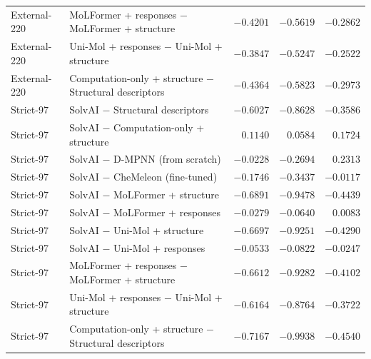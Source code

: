 \begin{longtable}{@{}p{}p{}rrr@{}}
External-220 & MoLFormer + responses $-$ MoLFormer + structure & $-0.4201$ & $-0.5619$ & $-0.2862$ \\
External-220 & Uni-Mol + responses $-$ Uni-Mol + structure & $-0.3847$ & $-0.5247$ & $-0.2522$ \\
External-220 & Computation-only + structure $-$ Structural descriptors & $-0.4364$ & $-0.5823$ & $-0.2973$ \\
Strict-97 & SolvAI $-$ Structural descriptors & $-0.6027$ & $-0.8628$ & $-0.3586$ \\
Strict-97 & SolvAI $-$ Computation-only + structure & $0.1140$ & $0.0584$ & $0.1724$ \\
Strict-97 & SolvAI $-$ D-MPNN (from scratch) & $-0.0228$ & $-0.2694$ & $0.2313$ \\
Strict-97 & SolvAI $-$ CheMeleon (fine-tuned) & $-0.1746$ & $-0.3437$ & $-0.0117$ \\
Strict-97 & SolvAI $-$ MoLFormer + structure & $-0.6891$ & $-0.9478$ & $-0.4439$ \\
Strict-97 & SolvAI $-$ MoLFormer + responses & $-0.0279$ & $-0.0640$ & $0.0083$ \\
Strict-97 & SolvAI $-$ Uni-Mol + structure & $-0.6697$ & $-0.9251$ & $-0.4290$ \\
Strict-97 & SolvAI $-$ Uni-Mol + responses & $-0.0533$ & $-0.0822$ & $-0.0247$ \\
Strict-97 & MoLFormer + responses $-$ MoLFormer + structure & $-0.6612$ & $-0.9282$ & $-0.4102$ \\
Strict-97 & Uni-Mol + responses $-$ Uni-Mol + structure & $-0.6164$ & $-0.8764$ & $-0.3722$ \\
Strict-97 & Computation-only + structure $-$ Structural descriptors & $-0.7167$ & $-0.9938$ & $-0.4540$ \\
\bottomrule\end{longtable}
\endgroup

